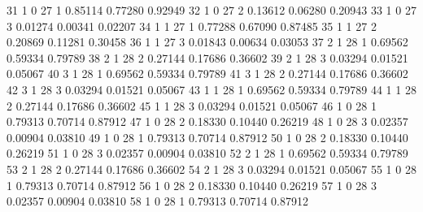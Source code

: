 \documentclass{article}
\begin{document}
\begin{Woutput}
  31      1       0      27       1       0.85114    0.77280    0.92949
  32      1       0      27       2       0.13612    0.06280    0.20943
  33      1       0      27       3       0.01274    0.00341    0.02207
  34      1       1      27       1       0.77288    0.67090    0.87485
  35      1       1      27       2       0.20869    0.11281    0.30458
  36      1       1      27       3       0.01843    0.00634    0.03053
  37      2       1      28       1       0.69562    0.59334    0.79789
  38      2       1      28       2       0.27144    0.17686    0.36602
  39      2       1      28       3       0.03294    0.01521    0.05067
  40      3       1      28       1       0.69562    0.59334    0.79789
  41      3       1      28       2       0.27144    0.17686    0.36602
  42      3       1      28       3       0.03294    0.01521    0.05067
  43      1       1      28       1       0.69562    0.59334    0.79789
  44      1       1      28       2       0.27144    0.17686    0.36602
  45      1       1      28       3       0.03294    0.01521    0.05067
  46      1       0      28       1       0.79313    0.70714    0.87912
  47      1       0      28       2       0.18330    0.10440    0.26219
  48      1       0      28       3       0.02357    0.00904    0.03810
  49      1       0      28       1       0.79313    0.70714    0.87912
  50      1       0      28       2       0.18330    0.10440    0.26219
  51      1       0      28       3       0.02357    0.00904    0.03810
  52      2       1      28       1       0.69562    0.59334    0.79789
  53      2       1      28       2       0.27144    0.17686    0.36602
  54      2       1      28       3       0.03294    0.01521    0.05067
  55      1       0      28       1       0.79313    0.70714    0.87912
  56      1       0      28       2       0.18330    0.10440    0.26219
  57      1       0      28       3       0.02357    0.00904    0.03810
  58      1       0      28       1       0.79313    0.70714    0.87912


\end{Woutput}
\end{document}
